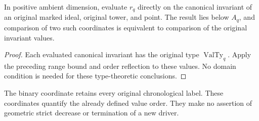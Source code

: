 \begin{theorem}
\label{hir:disjoint-invariant-ordinal-evaluation}
\leanok
In positive ambient dimension, evaluate $r_q$ directly on the canonical
invariant of an original marked ideal, original tower, and point. The
result lies below $A_q$, and comparison of two such coordinates is
equivalent to comparison of the original invariant values.
\end{theorem}
\begin{proof}
Each evaluated canonical invariant has the original type
$\operatorname{ValTy}_q$. Apply the preceding range bound and order
reflection to these values. No domain condition is needed for these
type-theoretic conclusions.
\end{proof}

\begin{remark}
The binary coordinate retains every original chronological label. These
coordinates quantify the already defined value order. They make no
assertion of geometric strict decrease or termination of a new driver.
\end{remark}
